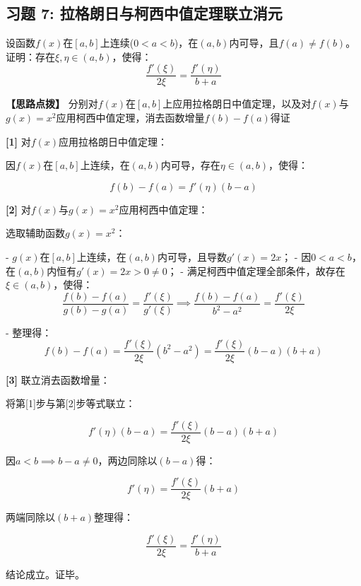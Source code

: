 \documentclass[11pt,a4paper,UTF8]{ctexart}
\begin{document}
\subsection{习题 7: 拉格朗日与柯西中值定理联立消元}

设函数$f(x)$在$[a, b]$上连续($0 < a < b$)，在$(a, b)$内可导，且$f(a) \neq f(b)$。证明：存在$\xi, \eta \in (a, b)$，使得：
\begin{equation*}
\frac{f'(\xi)}{2\xi} = \frac{f'(\eta)}{b + a}
\end{equation*}


\textbf{\color{DeepPurple}【思路点拨】} 分别对$f(x)$在$[a, b]$上应用拉格朗日中值定理，以及对$f(x)$与$g(x) = x^2$应用柯西中值定理，消去函数增量$f(b) - f(a)$得证


\begin{solbox}[分步推导与答题规范]
\textbf{[1]} 对$f(x)$应用拉格朗日中值定理：

因$f(x)$在$[a, b]$上连续，在$(a, b)$内可导，存在$\eta \in (a, b)$，使得：


\begin{equation*}
f(b) - f(a) = f'(\eta)(b - a)
\end{equation*}


\textbf{[2]} 对$f(x)$与$g(x) = x^2$应用柯西中值定理：

选取辅助函数$g(x) = x^2$：

- $g(x)$在$[a, b]$上连续，在$(a, b)$内可导，且导数$g'(x) = 2x$；
- 因$0 < a < b$，在$(a, b)$内恒有$g'(x) = 2x > 0 \neq 0$；
- 满足柯西中值定理全部条件，故存在$\xi \in (a, b)$，使得： 
\begin{equation*}
\frac{f(b) - f(a)}{g(b) - g(a)} = \frac{f'(\xi)}{g'(\xi)} \implies \frac{f(b) - f(a)}{b^2 - a^2} = \frac{f'(\xi)}{2\xi}
\end{equation*}


- 整理得： 
\begin{equation*}
f(b) - f(a) = \frac{f'(\xi)}{2\xi}(b^2 - a^2) = \frac{f'(\xi)}{2\xi}(b - a)(b + a)
\end{equation*}


\textbf{[3]} 联立消去函数增量：

将第[1]步与第[2]步等式联立：


\begin{equation*}
f'(\eta)(b - a) = \frac{f'(\xi)}{2\xi}(b - a)(b + a)
\end{equation*}


因$a < b \implies b - a \neq 0$，两边同除以$(b - a)$得：


\begin{equation*}
f'(\eta) = \frac{f'(\xi)}{2\xi}(b + a)
\end{equation*}


两端同除以$(b + a)$整理得：


\begin{equation*}
\frac{f'(\xi)}{2\xi} = \frac{f'(\eta)}{b + a}
\end{equation*}


结论成立。证毕。
\end{solbox}
\end{document}
